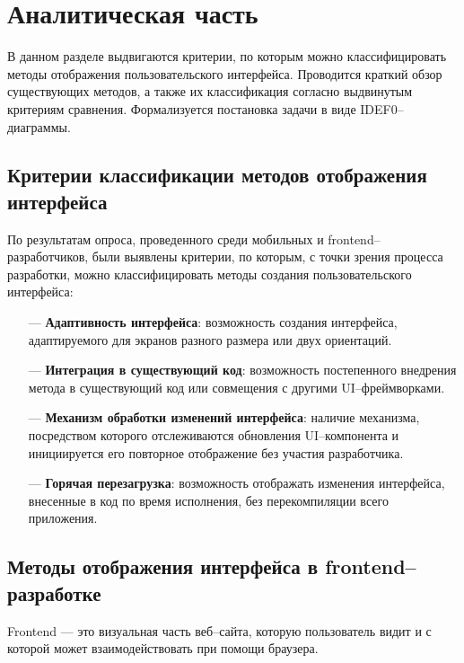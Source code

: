 \section{Аналитическая часть}

В данном разделе выдвигаются критерии, по которым можно классифицировать методы отображения пользовательского интерфейса.
Проводится краткий обзор существующих методов, а также их классификация согласно выдвинутым критериям сравнения. 
Формализуется постановка задачи в виде IDEF0--диаграммы.


\subsection{Критерии классификации методов отображения интерфейса} 

По результатам опроса, проведенного среди мобильных и frontend--разработчиков, были выявлены критерии, по которым, с точки зрения процесса разработки, можно классифицировать методы создания пользовательского интерфейса:

\begin{itemize}
	\item[---] \textbf{Адаптивность интерфейса}: возможность создания интерфейса, адаптируемого для экранов разного размера или двух ориентаций.
	\item[---] \textbf{Интеграция в существующий код}: возможность постепенного внедрения метода в существующий код или совмещения с другими UI--фреймворками.
	\item[---] \textbf{Механизм обработки изменений интерфейса}: наличие механизма, посредством которого отслеживаются обновления UI--компонента и инициируется его повторное отображение без участия разработчика.
	\item[---] \textbf{Горячая перезагрузка}: возможность отображать изменения интерфейса, внесенные в код по время исполнения, без перекомпиляции всего приложения. 
\end{itemize}

\subsection{Методы отображения интерфейса в frontend--разработке} 

Frontend --- это визуальная часть веб--сайта, которую пользователь видит и с которой может взаимодействовать при помощи браузера.

